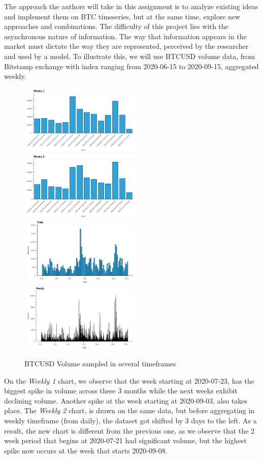\documentclass[10pt]{asme2ej}
\begin{document}
The approach the authors will take in this assignment is to analyze existing ideas and implement them on BTC timeseries, but at the same time, explore new approaches and combinations. The difficulty of this project lies with the asynchronous nature of information.
The way that information appears in the market must dictate the way they are represented, perceived by the researcher and used by a model. To illustrate this, we will use BTCUSD volume data, from Bitstamp exchange with index ranging from 2020-06-15 to 2020-09-15, aggregated weekly.

\begin{figure}[H]
	\centering
	\includegraphics[width=6cm, height = 3.3cm]{one}
	\includegraphics[width=6cm, height = 3.3cm]{two}
	\\[\smallskipamount]
	\includegraphics[width=6cm, height = 3.3cm]{three}
	\includegraphics[width=6cm, height = 3.3cm]{four}
	\caption{BTCUSD Volume sampled in several timeframes}\label{fig:example}
\end{figure}

On the \textit{Weekly 1} chart, we observe that the week starting at 2020-07-23, has the biggest spike in volume across these 3 months while the next weeks exhibit declining volume. Another spike at
the week starting at 2020-09-03, also takes place. The \textit{Weekly 2} chart, is drawn on the same data, but before aggregating in weekly
timeframe (from daily), the dataset got shifted by 3 days to the left. As a result, the new chart is different from the previous one, as we observe
that the 2 week period that begins at 2020-07-21 had significant volume, but the highest spike now occurs at the week that starts 2020-09-08.
\end{document}
